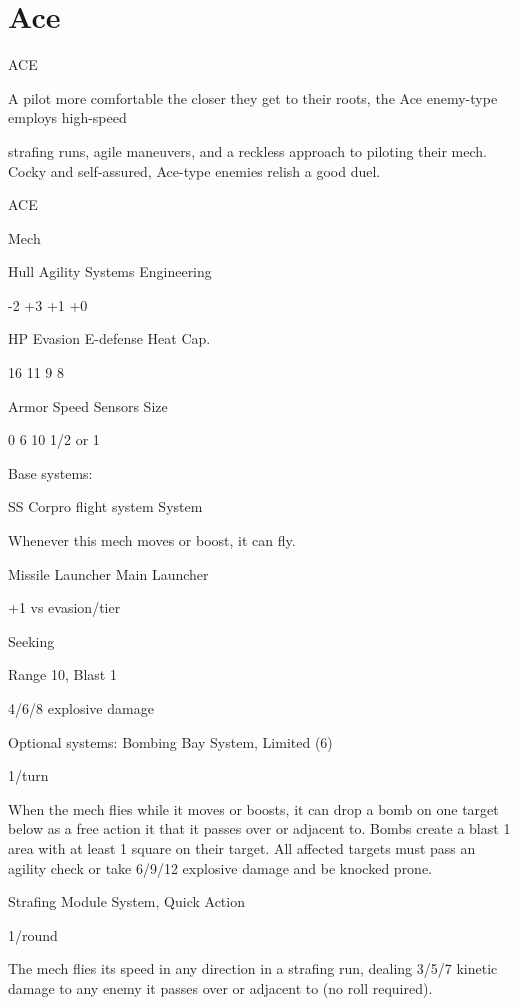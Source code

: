 \section{Ace}
                                                  ACE

A pilot more comfortable the closer they get to their roots, the Ace enemy-type employs high-speed

strafing runs, agile maneuvers, and a reckless approach to piloting their mech. Cocky and self-assured,
Ace-type enemies relish a good duel.


 ACE

 Mech

 Hull       Agility     Systems       Engineering

 -2         +3          +1            +0

 HP         Evasion     E-defense     Heat Cap.

 16         11          9             8

 Armor      Speed       Sensors       Size

 0          6           10            1/2 or 1

Base systems:

SS Corpro flight system
System

Whenever this mech moves or boost, it can fly.


Missile Launcher
Main Launcher

+1 vs evasion/tier

Seeking

Range 10, Blast 1

4/6/8 explosive damage


Optional systems:
Bombing Bay
System, Limited (6)

1/turn

When the mech flies while it moves or boosts, it can drop a bomb on one target below as a free
action it that it passes over or adjacent to. Bombs create a blast 1 area with at least 1 square on
their target. All affected targets must pass an agility check or take 6/9/12 explosive damage and
be knocked prone.





Strafing Module
System, Quick Action

1/round

The mech flies its speed in any direction in a strafing run, dealing 3/5/7 kinetic damage to any
enemy it passes over or adjacent to (no roll required).


